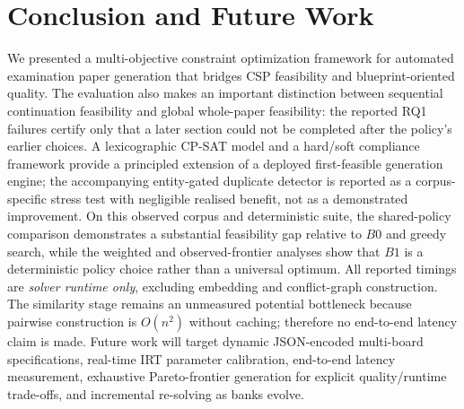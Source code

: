 \documentclass[runningheads]{llncs}
\begin{document}
\section{Conclusion and Future Work}
\label{sec:conclusion}

We presented a multi-objective constraint optimization framework for automated examination paper generation that bridges CSP feasibility and blueprint-oriented quality.
The evaluation also makes an important distinction between sequential continuation feasibility and global whole-paper feasibility: the reported RQ1 failures certify only that a later section could not be completed after the policy's earlier choices.
A lexicographic CP-SAT model and a hard/soft compliance framework provide a principled extension of a deployed first-feasible generation engine;
the accompanying entity-gated duplicate detector is reported as a corpus-specific stress test with negligible realised benefit, not as a demonstrated improvement.
On this observed corpus and deterministic suite, the shared-policy comparison demonstrates a substantial feasibility gap relative to $B0$ and greedy search, while the weighted and observed-frontier analyses show that $B1$ is a deterministic policy choice rather than a universal optimum.
All reported timings are \emph{solver runtime only}, excluding embedding and conflict-graph construction. The similarity stage remains an unmeasured potential bottleneck because pairwise construction is $O(n^2)$ without caching; therefore no end-to-end latency claim is made.
Future work will target dynamic JSON-encoded multi-board specifications, real-time IRT parameter calibration, end-to-end latency measurement, exhaustive Pareto-frontier generation for explicit quality/runtime trade-offs, and incremental re-solving as banks evolve.
\end{document}
